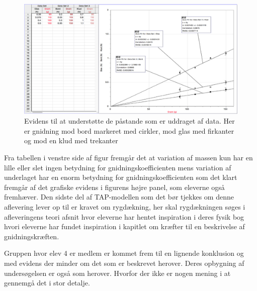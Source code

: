 \begin{figure}[h!]
	\centering
	\includegraphics[width=\textwidth]{Figs/EviAlm}
	\caption[Elev produktion 2]{Evidens til at understøtte de påstande som er uddraget af data. Her er gnidning mod bord markeret med cirkler, mod glas med firkanter og mod en klud med trekanter}
	\label{fig:evidens.alma}
\end{figure}

Fra tabellen i venstre side af figur  fremgår det at variation af massen kun har en lille eller slet ingen betydning for gnidningskoefficienten mens variation af underlaget har en enorm betydning for gnidningskoefficienten som det klart fremgår af det grafiske evidens i figurens højre panel, som eleverne også fremhæver. 
Den sidste del af TAP-modellen som det bør tjekkes om denne aflevering lever op til er kravet om rygdækning, her skal rygdækningen søges i afleveringens teori afsnit hvor eleverne har hentet inspiration i deres fysik bog \citep{Benoni2010} hvori eleverne har fundet inspiration i kapitlet om kræfter til en beskrivelse af gnidningskræften.

Gruppen hvor elev 4 er medlem er kommet frem til en lignende konklusion og med evidens der minder om det som er beskrevet herover. Deres opbygning af undersøgelsen er også som herover. Hvorfor der ikke er nogen mening i at gennemgå det i stor detalje. 

